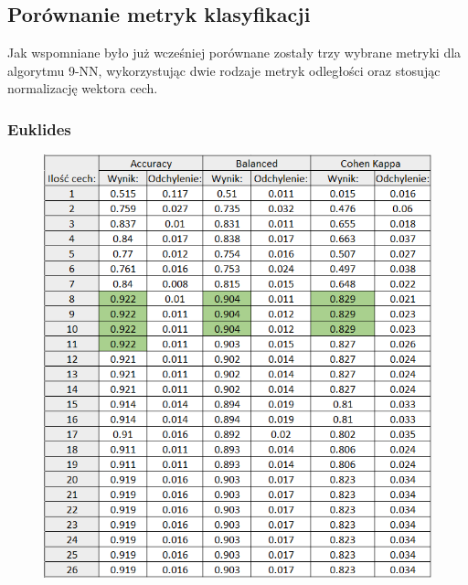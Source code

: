 \documentclass[12pt]{article}
\begin{document}

\subsection{Porównanie metryk klasyfikacji}
\indent Jak wspomniane było już wcześniej porównane zostały trzy wybrane metryki dla algorytmu 9-NN, wykorzystując dwie rodzaje metryk odległości oraz stosując normalizację wektora cech.
\subsubsection{Euklides}
\begin{figure}[H]
	\centering
	\label{metryki_euklides_norm_tab}
		\includegraphics[scale=0.9]{images/metrics/9nn_euklides_norm_tab.png}
\end{figure}
\end{document}
